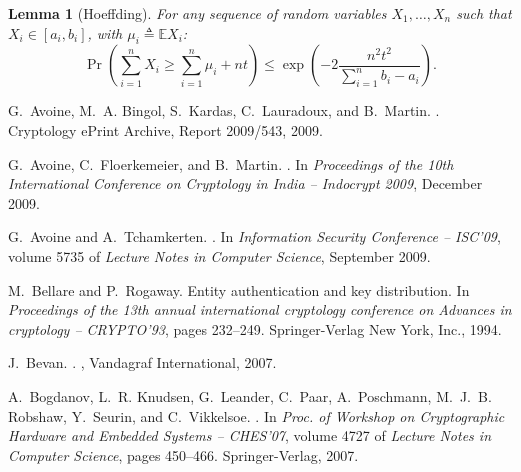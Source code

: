 \documentclass{article}
\newcommand \defn {\mathrel{\triangleq}}
\newcommand \E {\mathbb{E}}
\newtheorem{lemma}{Lemma}
\begin{document}
\appendix


\begin{lemma}[Hoeffding]
  For any sequence of random variables $X_1, \ldots, X_n$ such that
  $X_i \in [a_i, b_i]$, with  $\mu_i \defn \E X_i$:
  \begin{equation}
    \Pr\left(
      \sum_{i=1}^n X_i \geq \sum_{i=1}^n \mu_i + n t
    \right)
    \leq
    \exp\left(
      -2\frac{n^2t^2}{\sum_{i=1}^n b_i - a_i}
    \right).
    \label{eq:hoeffding}
  \end{equation}
  \label{lem:hoeffding}
\end{lemma}



\begin{thebibliography}{99}

G.~Avoine, M.~A. Bingol, S.~Kardas, C.~Lauradoux, and B.~Martin.
.
\newblock Cryptology ePrint Archive, Report 2009/543, 2009.

G.~Avoine, C.~Floerkemeier, and B.~Martin.
.
\newblock In {\em Proceedings of the 10th International Conference on
  Cryptology in India -- Indocrypt 2009}, December 2009.

G.~Avoine and A.~Tchamkerten.
.
\newblock In {\em Information Security Conference -- ISC'09}, volume 5735 of
  {\em Lecture Notes in Computer Science}, September 2009.

M.~Bellare and P.~Rogaway.
\newblock Entity authentication and key distribution.
\newblock In {\em Proceedings of the 13th annual international cryptology
  conference on Advances in cryptology -- CRYPTO'93}, pages 232--249.
  Springer-Verlag New York, Inc., 1994.

J.~Bevan.
.
, Vandagraf International, 2007.

A.~Bogdanov, L.~R. Knudsen, G.~Leander, C.~Paar, A.~Poschmann, M.~J.~B.
  Robshaw, Y.~Seurin, and C.~Vikkelsoe.
.
\newblock In {\em Proc. of Workshop on Cryptographic Hardware and Embedded
  Systems -- CHES'07}, volume 4727 of {\em Lecture Notes in Computer Science},
  pages 450--466. Springer-Verlag, 2007.


\end{thebibliography}
\end{document}
